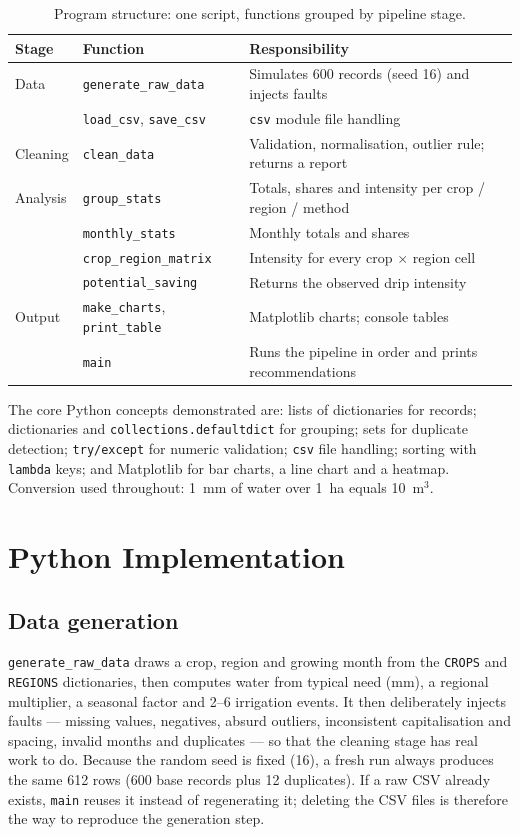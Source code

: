 \documentclass[11pt,a4paper]{article}
\begin{document}
\begin{table}[h]
\centering\small
\caption{Program structure: one script, functions grouped by pipeline stage.}
\label{tab:modules}
\begin{tabular}{>{\raggedright\arraybackslash}p{2.0cm}
  >{\raggedright\arraybackslash}p{3.9cm}
  >{\raggedright\arraybackslash}p{9.0cm}}
\toprule
Stage & Function & Responsibility \\
\midrule
Data & \texttt{generate\_raw\_data} & Simulates 600 records (seed 16) and injects faults \\
     & \texttt{load\_csv}, \texttt{save\_csv} & \texttt{csv} module file handling \\
Cleaning & \texttt{clean\_data} & Validation, normalisation, outlier rule; returns a report \\
Analysis & \texttt{group\_stats} & Totals, shares and intensity per crop / region / method \\
     & \texttt{monthly\_stats} & Monthly totals and shares \\
     & \texttt{crop\_region\_matrix} & Intensity for every crop $\times$ region cell \\
     & \texttt{potential\_saving} & Returns the observed drip intensity \\
Output & \texttt{make\_charts}, \texttt{print\_table} & 5 Matplotlib charts; console tables \\
     & \texttt{main} & Runs the pipeline in order and prints recommendations \\
\bottomrule
\end{tabular}
\end{table}

The core Python concepts demonstrated are: lists of dictionaries for records;
dictionaries and \texttt{collections.defaultdict} for grouping; sets for duplicate
detection; \texttt{try/except} for numeric validation; \texttt{csv} file handling;
sorting with \texttt{lambda} keys; and Matplotlib for bar charts, a line chart and a
heatmap. Conversion used throughout: 1~mm of water over 1~ha equals 10~m$^3$.

\section{Python Implementation}
\subsection{Data generation}
\texttt{generate\_raw\_data} draws a crop, region and growing month from the
\texttt{CROPS} and \texttt{REGIONS} dictionaries, then computes water from typical need
(mm), a regional multiplier, a seasonal factor and 2--6 irrigation events. It then
deliberately injects faults --- missing values, negatives, absurd outliers, inconsistent
capitalisation and spacing, invalid months and duplicates --- so that the cleaning
stage has real work to do. Because the random seed is fixed (16), a fresh run always
produces the same 612 rows (600 base records plus 12 duplicates). If a raw CSV already
exists, \texttt{main} reuses it instead of regenerating it; deleting the CSV files is
therefore the way to reproduce the generation step.
\end{document}
